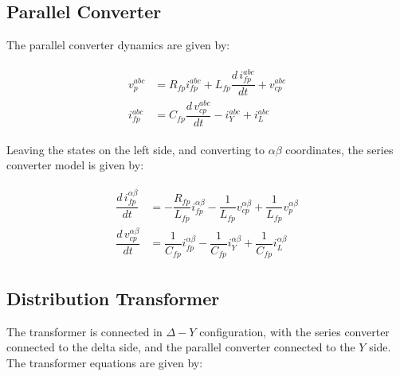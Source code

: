 \subsection{Parallel Converter}

The parallel converter dynamics are given by:

\begin{align}
    \begin{aligned}
        v_p^{abc} &= R_{fp}i_{fp}^{abc} + L_{fp}\dfrac{d\,i_{fp}^{abc}}{dt} + v_{cp}^{abc} \\
        i_{fp}^{abc} &= C_{fp}\dfrac{d\,v_{cp}^{abc}}{dt} - i_Y^{abc} + i_L^{abc}
    \end{aligned}
\end{align}

Leaving the states on the left side, and converting to $\alpha\beta$ coordinates, the series converter model is given by:

\begin{align}
    \begin{aligned}
        \dfrac{d\,i_{fp}^{\alpha\beta}}{dt} &= -\dfrac{R_{fp}}{L_{fp}}i_{fp}^{\alpha\beta} - \dfrac{1}{L_{fp}}v_{cp}^{\alpha\beta} + \dfrac{1}{L_{fp}}v_p^{\alpha\beta} \\
        \dfrac{d\,v_{cp}^{\alpha\beta}}{dt} &= \dfrac{1}{C_{fp}}i_{fp}^{\alpha\beta} - \dfrac{1}{C_{fp}}i_Y^{\alpha\beta} + \dfrac{1}{C_{fp}}i_L^{\alpha\beta}
    \end{aligned}
\end{align}

\subsection{Distribution Transformer}

The transformer is connected in $\Delta-Y$ configuration, with the series converter connected to the delta side, and the parallel converter connected to the $Y$ side. The transformer equations are given by:


